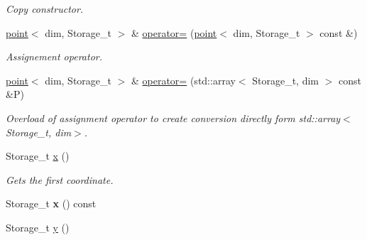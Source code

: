 \begin{DoxyCompactItemize}
\begin{DoxyCompactList}\small\item\em Copy constructor. \item\end{DoxyCompactList}\item 
\hypertarget{classBGLgeom_1_1point_a421fb221add58cab23f9cc4bdb1b32b7}{
\hyperlink{classBGLgeom_1_1point}{point}$<$ dim, Storage\_\-t $>$ \& \hyperlink{classBGLgeom_1_1point_a421fb221add58cab23f9cc4bdb1b32b7}{operator=} (\hyperlink{classBGLgeom_1_1point}{point}$<$ dim, Storage\_\-t $>$ const \&)}
\label{classBGLgeom_1_1point_a421fb221add58cab23f9cc4bdb1b32b7}

\begin{DoxyCompactList}\small\item\em Assignement operator. \item\end{DoxyCompactList}\item 
\hypertarget{classBGLgeom_1_1point_ac2eb7150775bb3263ccbf1e2893c9612}{
\hyperlink{classBGLgeom_1_1point}{point}$<$ dim, Storage\_\-t $>$ \& \hyperlink{classBGLgeom_1_1point_ac2eb7150775bb3263ccbf1e2893c9612}{operator=} (std::array$<$ Storage\_\-t, dim $>$ const \&P)}
\label{classBGLgeom_1_1point_ac2eb7150775bb3263ccbf1e2893c9612}

\begin{DoxyCompactList}\small\item\em Overload of assignment operator to create conversion directly form std::array$<$Storage\_\-t, dim$>$. \item\end{DoxyCompactList}\item 
\hypertarget{classBGLgeom_1_1point_a4b3b5eacaf8d7c64790839e2b8e1c706}{
Storage\_\-t \hyperlink{classBGLgeom_1_1point_a4b3b5eacaf8d7c64790839e2b8e1c706}{x} ()}
\label{classBGLgeom_1_1point_a4b3b5eacaf8d7c64790839e2b8e1c706}

\begin{DoxyCompactList}\small\item\em Gets the first coordinate. \item\end{DoxyCompactList}\item 
\hypertarget{classBGLgeom_1_1point_aa73b24cd393aa1c9ec795bd949faae58}{
Storage\_\-t {\bfseries x} () const }
\label{classBGLgeom_1_1point_aa73b24cd393aa1c9ec795bd949faae58}

\item 
\hypertarget{classBGLgeom_1_1point_ab6a571dcc711cb0741d49c75b39bb61b}{
Storage\_\-t \hyperlink{classBGLgeom_1_1point_ab6a571dcc711cb0741d49c75b39bb61b}{y} ()}
\label{classBGLgeom_1_1point_ab6a571dcc711cb0741d49c75b39bb61b}


\end{DoxyCompactItemize}
